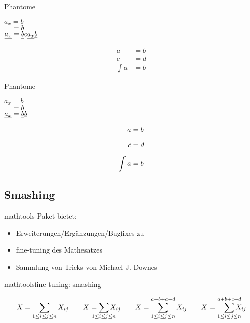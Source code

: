 \documentclass[
	vorläufig=false,
	datum=2022-11-02,
	titel={Mathematiksatz II},
	web=true,
	max,
	aspectratio=1610,
]{../tex/latexkurs-slides}
\begin{document}
\begin{frame}[fragile]{Phantome}
\begin{LTXexample}[width=.4\textwidth]
\(a_x = b\)\\
\(\hphantom{a_x} = b\)\\
\(\underline{a_x} = \underline{b\vphantom{a_x}} c \underline{a_x} \underline b\)
\end{LTXexample}
\begin{LTXexample}
\begin{align*}
a &= b\\
c &= d\\
\int a &= b
\end{align*}
\end{LTXexample}
\end{frame}

\begin{frame}[fragile]{Phantome}
\begin{LTXexample}[width=.4\textwidth]
\(a_x = b\)\\
\(\hphantom{a_x} = b\)\\
\(\underline{a_x} = \underline{b\vphantom{a_x}}\underline b\)
\end{LTXexample}
\begin{LTXexample}
\begin{align*}
a &= b\\
\vphantom{\int} c &= d\\
\int a &= b
\end{align*}
\end{LTXexample}
\end{frame}


\subsection{Smashing}
\begin{frame}{mathtools}
\vfill
Paket  bietet:
\begin{itemize}
\item Erweiterungen/Ergänzungen/Bugfixes zu 
\item fine-tuning des Mathesatzes
\item Sammlung von Tricks von Michael J. Downes
\end{itemize}
\end{frame}

\begin{frame}[fragile]{mathtools}{fine-tuning: smashing}
\begin{LTXexample}[pos=t]
\[
  X = \sum_{1\le i\le j\le n} X_{ij} \qquad
  X = \sum_{\mathclap{1\le i\le j\le n}} X_{ij} \qquad
  X = \sum_{\mathclap{1\le i\le j\le n}}^{a+b+c+d} X_{ij} \qquad
  X = \smashoperator[r]{\sum_{1\le i\le j\le n}^{a+b+c+d}} X_{ij}
\]
\end{LTXexample}
\end{frame}
\end{document}
